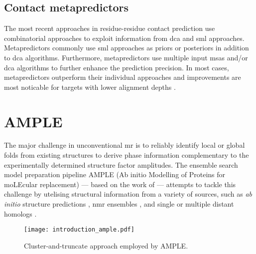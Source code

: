 \subsection{Contact metapredictors}
The most recent approaches in residue-residue contact prediction use combinatorial approaches to exploit information from \gls{dca} and \gls{sml} approaches. Metapredictors commonly use \gls{sml} approaches as priors \cite{Ovchinnikov2015-tn} or posteriors \cite{Skwark2014-qp,Jones2015-vq,Adhikari2017-kt,He2017-fn,Michel2017-pm,Wang2017-rx} in addition to \gls{dca} algorithms. Furthermore, metapredictors use multiple input \gls{msa}s and/or \gls{dca} algorithms to further enhance the prediction precision. In most cases, metapredictors outperform their individual approaches and improvements are most noticable for targets with lower alignment depths \cite{De_Oliveira2017-gj,Wuyun2016-hh,Wang2017-rx}.

%
%

\section{AMPLE}
The major challenge in unconventional \gls{mr} is to reliably identify local or global folds from existing structures to derive phase information complementary to the experimentally determined structure factor amplitudes. The ensemble search model preparation pipeline AMPLE (Ab initio Modelling of Proteins for moLEcular replacement) --- based on the work of \textcite{Rigden2008-vo} --- attempts to tackle this challenge by utelising structural information from a variety of sources, such as \textit{ab initio} structure predictions \cite{Bibby2012-lm,Keegan2015-zb,Simkovic2016-wk,Thomas2015-wu,Thomas2017-sh}, \gls{nmr} ensembles \cite{Bibby2013-cp}, and single \cite{Rigden2018-zt} or multiple distant homologs \cite{Bruhn2014-aa,Hotta2014-me}. 

\begin{figure}[H]
    \centering
    \texttt{[image: introduction\_ample.pdf]}
    \caption{Cluster-and-truncate approach employed by AMPLE.}
    \label{fig:introduction_ample}
\end{figure}


